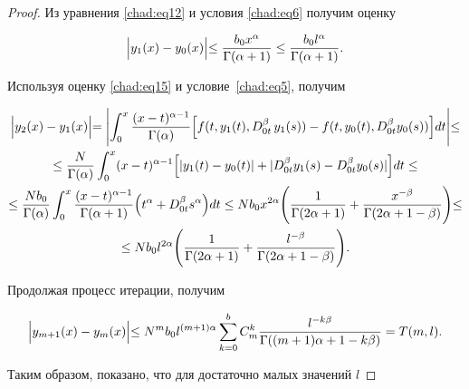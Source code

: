 \begin{proof}
Из уравнения \eqref{chad:eq12} и условия \eqref{chad:eq6} получим оценку

\begin{equation}

\label{chad:eq15}

\Bigl|y_1(x)-y_0(x)\Bigl|\leq\frac{b_0x^\alpha}{\Gamma(\alpha+1)}\leq \frac{b_0l^\alpha}{\Gamma(\alpha+1)}.

\end{equation}

Используя оценку \eqref{chad:eq15} и условие~\eqref{chad:eq5},  получим

\begin{multline*}


\Bigl|y_2(x)-y_1(x)\Bigl|=\Biggl|\int_0^x\frac{(x-t)^{\alpha-1}}{\Gamma(\alpha)}\Bigl[f(t, y_1(t), D_{0t}^\beta \,  y_1(s))-f(t, y_0(t), D_{0t}^\beta y_0(s))\Bigl]dt\Biggl|\leq

\\

\leq\frac{N}{\Gamma(\alpha)}\int_0^x(x-t)^{\alpha-1}\Bigl[|y_1(t)-y_0(t)|+|D_{0t}^\beta y_1(s)-D_{0t}^\beta y_0(s)|\Bigl]dt\leq

\\

\leq\frac{Nb_0}{\Gamma(\alpha)}\int_0^x\frac{(x-t)^{\alpha-1}}{\Gamma(\alpha+1)}\Bigl(t^\alpha+D_{0t}^\beta s^\alpha\Bigl)dt %

\leq Nb_0x^{2\alpha}\Biggl(\frac{1}{\Gamma(2\alpha+1)}+\frac{x^{-\beta}}{\Gamma(2\alpha+1-\beta)}\Biggl)\leq \\ \leq Nb_0l^{2\alpha}\Biggl(\frac{1}{\Gamma(2\alpha+1)}+\frac{l^{-\beta}}{\Gamma(2\alpha+1-\beta)}\Biggl).

\end{multline*}  





Продолжая процесс итерации,  получим

\begin{equation*}


\Bigl|y_{m+1}(x)-y_m(x)\Bigl|\leq N^mb_0l^{(m+1)\alpha}\sum_{k=0}^{b}C_m^k\frac{l^{-k\beta}}{\Gamma((m+1)\alpha+1-k\beta)}=T(m, l).

\end{equation*}



Таким образом, показано,  что для достаточно малых значений $l$ 


\end{proof}
